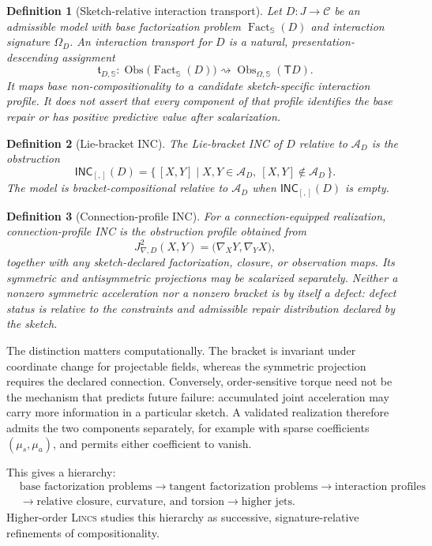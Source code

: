 \documentclass{article}
\newtheorem{definition}{Definition}
\newcommand{\C}{\mathcal{C}}
\newcommand{\T}{\mathsf{T}}
\newcommand{\INC}{\mathsf{INC}}
\newcommand{\Fact}{\operatorname{Fact}}
\newcommand{\Obs}{\operatorname{Obs}}
\begin{document}
\begin{definition}[Sketch-relative interaction transport]
Let $D:J\to\C$ be an admissible model with base factorization problem
$\Fact_{\mathbb S}(D)$ and interaction signature $\Omega_D$.  An interaction
transport for $D$ is a natural, presentation-descending assignment
\[
\mathfrak t_{D,\mathbb S}:
\Obs\big(\Fact_{\mathbb S}(D)\big)
\rightsquigarrow
\Obs_{\Omega,\mathbb S}(\T D).
\]
It maps base non-compositionality to a candidate sketch-specific interaction
profile.  It does not assert that every component of that profile identifies
the base repair or has positive predictive value after scalarization.
\end{definition}

\begin{definition}[Lie-bracket INC]
The Lie-bracket INC of $D$ relative to $\mathcal A_D$ is the obstruction
\[
\INC_{[,]}(D)
  =
  \{\, [X,Y]\mid X,Y\in\mathcal A_D,\ [X,Y]\notin\mathcal A_D\,\}.
\]
The model is bracket-compositional relative to $\mathcal A_D$ when
$\INC_{[,]}(D)$ is empty.
\end{definition}

\begin{definition}[Connection-profile INC]
For a connection-equipped realization, connection-profile INC is the
obstruction profile obtained from
\[
J^2_{\nabla,D}(X,Y)
=
\big(\nabla_XY,\nabla_YX\big),
\]
together with any sketch-declared factorization, closure, or observation maps.
Its symmetric and antisymmetric projections may be scalarized separately.
Neither a nonzero symmetric acceleration nor a nonzero bracket is by itself a
defect: defect status is relative to the constraints and admissible repair
distribution declared by the sketch.
\end{definition}

The distinction matters computationally.  The bracket is invariant under
coordinate change for projectable fields, whereas the symmetric projection
requires the declared connection.  Conversely, order-sensitive torque need
not be the mechanism that predicts future failure: accumulated joint
acceleration may carry more information in a particular sketch.  A validated
realization therefore admits the two components separately, for example with
sparse coefficients $(\mu_s,\mu_a)$, and permits either coefficient to vanish.

This gives a hierarchy:
\[
\begin{aligned}
&\text{base factorization problems}
\to
\text{tangent factorization problems}
\to
\text{interaction profiles}\\
&\to
\text{relative closure, curvature, and torsion}
\to
\text{higher jets}.
\end{aligned}
\]
Higher-order \textsc{Lincs} studies this hierarchy as successive,
signature-relative refinements of compositionality.
\end{document}
